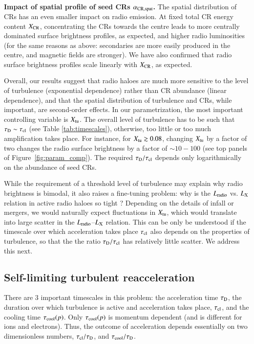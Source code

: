 \documentclass[fleqn,usenatbib,useAMS]{mnras}
\begin{document}
{\bf Impact of spatial profile of seed CRs $\alpha_{\rm CR, spat}$.} The spatial distribution of CRs has an even smaller impact on radio emission. At fixed total CR energy content $X_{\rm CR}$, concentrating the CRs towards the centre leads to more centrally dominated surface brightness profiles, as expected, and higher radio luminosities (for the same reasons as above: secondaries are more easily produced in the centre, and magnetic fields are stronger). We have also confirmed that radio surface brightness profiles scale linearly with $X_{\rm CR}$, as expected. 

Overall, our results suggest that radio haloes are much more sensitive to the level of turbulence (exponential dependence) rather than CR abundance (linear dependence), and that the spatial distribution of turbulence and CRs, while important, are second-order effects. In our parametrization, the most important controlling variable is $X_{\rm tu}$. The overall level of turbulence has to be such that $\tau_{\rm D} \sim \tau_{\rm cl}$ (see Table \ref{tab:timescales}), otherwise, too little or too much amplification takes place. For instance, for $X_{\mathrm{tu}}\gtrsim0.08$, changing $X_{\mathrm{tu}}$ by a factor of two changes the radio surface brightness by a factor of $\sim 10-100$ (see top panels of Figure~\ref{fig:param_comp}). The required $\tau_{\rm D}/\tau_{\rm cl}$ depends only logarithmically on the abundance of seed CRs.

While the requirement of a threshold level of turbulence may explain why radio brightness is bimodal, it also raises a fine-tuning problem: why is the $L_{\rm radio}$ vs. $L_{\rm X}$ relation in active radio haloes so tight \citep{Brunetti2009}? Depending on the details of infall or mergers, we would naturally expect fluctuations in $X_{\rm tu}$, which would translate into large scatter in the $L_{\rm radio}$--$L_{\rm X}$ relation. This can be only be understood if the timescale over which acceleration takes place $\tau_{\rm cl}$ also depends on the properties of turbulence, so that the the ratio $\tau_{\rm D}/\tau_{\rm cl}$ has relatively little scatter. We address this next. 

\subsection{Self-limiting turbulent reacceleration}
\label{sect:self-limiting} 

There are 3 important timescales in this problem: the acceleration time $\tau_{\rm D}$, the duration over which turbulence is active and acceleration takes place, $\tau_{\rm cl}$, and the cooling time $\tau_{\rm cool}(p)$. Only $\tau_{\rm cool}(p)$ is momentum dependent (and is different for ions and electrons). Thus, the outcome of acceleration depends essentially on two dimensionless numbers, $\tau_{\rm cl}/\tau_{\rm D}$, and $\tau_{\rm cool}/\tau_{\rm D}$. 
\end{document}
